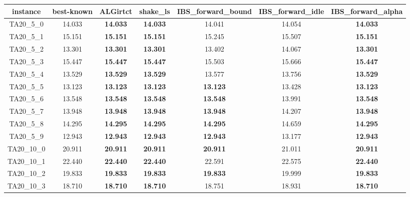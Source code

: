 \begin{tabular}{cc|cc|ccc}
instance & best-known & ALGirtct & shake\_ls & IBS\_forward\_bound & IBS\_forward\_idle & IBS\_forward\_alpha \\ 
 \hline 
TA20\_5\_0         & 14.033           & {\bf 14.033}     & {\bf 14.033}     & 14.041           & 14.054           & {\bf 14.033}    \\ 
TA20\_5\_1         & 15.151           & {\bf 15.151}     & {\bf 15.151}     & 15.245           & 15.507           & {\bf 15.151}    \\ 
TA20\_5\_2         & 13.301           & {\bf 13.301}     & {\bf 13.301}     & 13.402           & 14.067           & {\bf 13.301}    \\ 
TA20\_5\_3         & 15.447           & {\bf 15.447}     & {\bf 15.447}     & 15.503           & 15.666           & {\bf 15.447}    \\ 
TA20\_5\_4         & 13.529           & {\bf 13.529}     & {\bf 13.529}     & 13.577           & 13.756           & {\bf 13.529}    \\ 
TA20\_5\_5         & 13.123           & {\bf 13.123}     & {\bf 13.123}     & {\bf 13.123}     & 13.428           & {\bf 13.123}    \\ 
TA20\_5\_6         & 13.548           & {\bf 13.548}     & {\bf 13.548}     & {\bf 13.548}     & 13.991           & {\bf 13.548}    \\ 
TA20\_5\_7         & 13.948           & {\bf 13.948}     & {\bf 13.948}     & {\bf 13.948}     & 14.207           & {\bf 13.948}    \\ 
TA20\_5\_8         & 14.295           & {\bf 14.295}     & {\bf 14.295}     & {\bf 14.295}     & 14.659           & {\bf 14.295}    \\ 
TA20\_5\_9         & 12.943           & {\bf 12.943}     & {\bf 12.943}     & {\bf 12.943}     & 13.177           & {\bf 12.943}    \\ 
TA20\_10\_0        & 20.911           & {\bf 20.911}     & {\bf 20.911}     & {\bf 20.911}     & 21.011           & {\bf 20.911}    \\ 
TA20\_10\_1        & 22.440           & {\bf 22.440}     & {\bf 22.440}     & 22.591           & 22.575           & {\bf 22.440}    \\ 
TA20\_10\_2        & 19.833           & {\bf 19.833}     & {\bf 19.833}     & {\bf 19.833}     & 19.999           & {\bf 19.833}    \\ 
TA20\_10\_3        & 18.710           & {\bf 18.710}     & {\bf 18.710}     & 18.751           & 18.931           & {\bf 18.710}    \\ 

\end{tabular}

